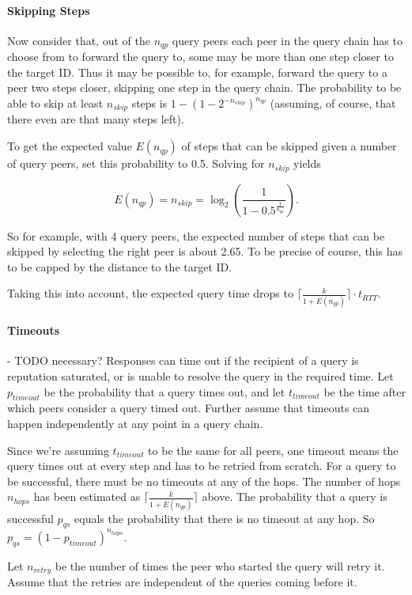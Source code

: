 \paragraph{Skipping Steps}
Now consider that, out of the $n_{qp}$ query peers each peer in the query chain
has to choose from to forward the query to, some may be more than one step
closer to the target ID. Thus it may be possible to, for example, forward the
query to a peer two steps closer, skipping one step in the query chain. The
probability to be able to skip at least $n_{skip}$ steps is $1 - (1 -
2^{-n_{skip}})^{n_{qp}}$ (assuming, of course, that there even are that many
steps left).

To get the expected value $E(n_{qp})$ of steps that can be skipped given a
number of query peers, set this probability to 0.5. Solving for $n_{skip}$
yields

\[E(n_{qp}) = n_{skip} = \log_2\left(\frac{1}{1 -
0.5^{\frac{1}{n_{qp}}}}\right).\]

So for example, with 4 query peers, the expected number of steps that can be
skipped by selecting the right peer is about 2.65. To be precise of course, this
has to be capped by the distance to the target ID.

Taking this into account, the expected query time drops to $\lceil\frac{k}{1 +
E(n_{qp})}\rceil \cdot t_{RTT}$.

\paragraph{Timeouts}
- TODO necessary?
Responses can time out if the recipient of a query is reputation saturated, or
is unable to resolve the query in the required time. Let $p_{timeout}$ be the
probability that a query times out, and let $t_{timeout}$ be the time after
which peers consider a query timed out. Further assume that timeouts can happen
independently at any point in a query chain.

Since we're assuming $t_{timeout}$ to be the same for all peers, one timeout
means the query times out at every step and has to be retried from scratch. For
a query to be successful, there must be no timeouts at any of the hops. The
number of hops $n_{hops}$ has been estimated as $\lceil\frac{k}{1 +
E(n_{qp})}\rceil$ above. The probability that a query is successful $p_{qs}$
equals the probability that there is no timeout at any hop. So $p_{qs} = (1 -
p_{timeout})^{n_{hops}}$.

Let $n_{retry}$ be the number of times the peer who started the query will retry
it. Assume that the retries are independent of the queries coming
before it.

